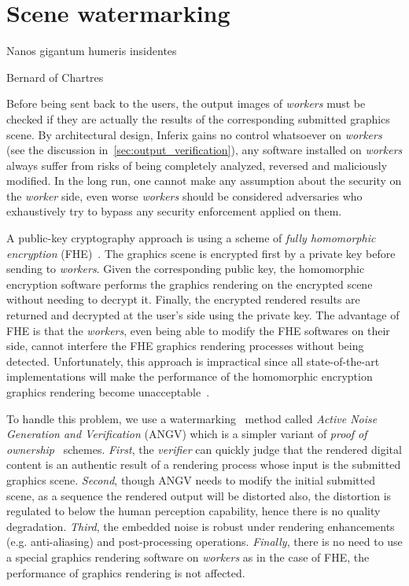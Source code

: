 \chapter{Scene watermarking}
\label{ch:scene_watermarking}
\epigraph{Nanos gigantum humeris insidentes}{Bernard of Chartres}

Before being sent back to the users, the output images of \emph{workers} must be checked if they are actually the results of the corresponding submitted graphics scene. By architectural design, Inferix gains no control whatsoever on \emph{workers} (see the discussion in~\autoref{sec:output_verification}), any software installed on \emph{workers} always suffer from risks of being completely analyzed, reversed and maliciously modified. In the long run, one cannot make any assumption about the security on the \emph{worker} side, even worse \emph{workers} should be considered adversaries who exhaustively try to bypass any security enforcement applied on them.

A public-key cryptography approach is using a scheme of \emph{fully homomorphic encryption} (FHE)~\cite{Gentry2009}. The graphics scene is encrypted first by a private key before sending to \emph{workers}. Given the corresponding public key, the homomorphic encryption software performs the graphics rendering on the encrypted scene without needing to decrypt it. Finally, the encrypted rendered results are returned and decrypted at the user's side using the private key. The advantage of FHE is that the \emph{workers}, even being able to modify the FHE softwares on their side, cannot interfere the FHE graphics rendering processes without being detected. Unfortunately, this approach is impractical since all state-of-the-art implementations will make the performance of the homomorphic encryption graphics rendering become unacceptable~\cite{9910347}.

To handle this problem, we use a watermarking~\cite{Cox1997,Cox1999} method called \emph{Active Noise Generation and Verification} (ANGV) which is a simpler variant of \emph{proof of ownership}~\cite{Wu1998,Yeung1997} schemes. \emph{First}, the \emph{verifier} can quickly judge that the rendered digital content is an authentic result of a rendering process whose input is the submitted graphics scene. \emph{Second}, though ANGV needs to modify the initial submitted scene, as a sequence the rendered output will be distorted also, the distortion is regulated to below the human perception capability, hence there is no quality degradation. \emph{Third}, the embedded noise is robust under rendering enhancements (e.g. anti-aliasing) and post-processing operations. \emph{Finally}, there is no need to use a special graphics rendering software on \emph{workers} as in the case of FHE, the performance of graphics rendering is not affected.

